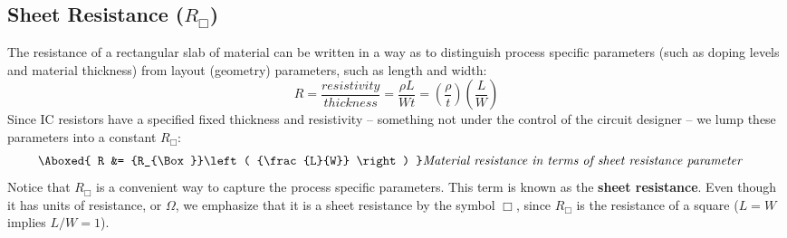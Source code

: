 \subsection{Sheet Resistance (\texorpdfstring{$R_{\Box}$}{})} \label{sec:sheetR}
The resistance of a rectangular slab of material can be written in a way as to distinguish process specific parameters (such as doping levels and material thickness) from layout (geometry) parameters, such as length and width: 
    \begin{equation*} 
        R = \frac{resistivity}{thickness} = \frac{{\rho L}}{{Wt}} = \left( {\frac{\rho}{t}} \right)\left( {\frac{L}{W}} \right)
    \end{equation*}
Since IC resistors have a specified fixed thickness and resistivity – something not under the control of the circuit designer – we lump these parameters into a constant $R_{\Box}$:
    \begin{align} 
        \Aboxed{ R &= {R_{\Box}}\left( {\frac{L}{W}} \right) } &\textit{Material resistance in terms of sheet resistance parameter}
    \end{align}
Notice that $R_{\Box}$ is a convenient way to capture the process specific parameters.  This term is known as the \textbf{sheet resistance}.  Even though it has units of resistance, or $\Omega$, we emphasize that it is a sheet resistance by the symbol $\Box$, since $R_{\Box}$ is the resistance of a square ($L = W$ implies $L/W = 1$).  
